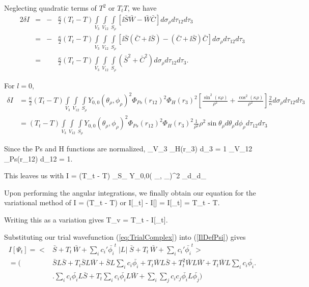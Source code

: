 \documentclass[Dissertation.tex]{subfiles}
\begin{document}
\noindent Neglecting quadratic terms of $T^2$ or $T_t T$, we have
\begin{alignat}{2}
\nonumber \delta I &={}& -&\frac{\kappa}{2} (T_t - T) \int\limits_{V_3} \int\limits_{V_{12}} \int\limits_{S_\rho} \left[\ii \bar{S}\bar{W} - \bar{W}\bar{C}\right] d\sigma_\rho d\tau_{12} d\tau_3 \\
\nonumber &={}& -&\frac{\kappa}{2} (T_t - T) \int\limits_{V_3} \int\limits_{V_{12}} \int\limits_{S_\rho} \left[\ii\bar{S}\left(\bar{C} + \ii\bar{S}\right) - \left(\bar{C} + \ii\bar{S}\right)\bar{C}\right] d\sigma_\rho d\tau_{12} d\tau_3 \\
&={}& &\frac{\kappa}{2} (T_t - T) \int\limits_{V_3} \int\limits_{V_{12}} \int\limits_{S_\rho} \left(\bar{S}^2 + \bar{C}^2\right) d\sigma_\rho d\tau_{12} d\tau_3.
\end{alignat}

For $l = 0$,
\begin{align}
\nonumber \delta I &= \frac{\kappa}{2} (T_t - T) \int\limits_{V_3} \int\limits_{V_{12}} \int\limits_{S_\rho} Y_{0,0}\left( \theta_\rho, \phi_\rho \right)^2 \Phi_{Ps}(r_{12})^2 \Phi_H(r_3)^2 \left[ \frac{\sin^2(\kappa\rho)}{\rho^2} + \frac{\cos^2(\kappa\rho)}{\rho^2}\right] \frac{2}{\kappa} d\sigma_\rho d\tau_{12} d\tau_3 \\
&= (T_t - T) \int\limits_{V_3} \int\limits_{V_{12}} \int\limits_{S_\rho} Y_{0,0}\left( \theta_\rho, \phi_\rho \right)^2 \Phi_{Ps}(r_{12})^2 \Phi_H(r_3)^2 \frac{1}{\rho^2} \rho^2 \sin\theta_\rho d\theta_\rho d\phi_\rho d\tau_{12} d\tau_3
\end{align}

Since the Ps and H functions are normalized,
\beq
\int\limits_{V_3}\! \Phi_H(r_3) d\tau_3 = 1  \int\limits_{V_{12}}\! \Phi_{Ps}(r_{12}) d\tau_{12} = 1.
\label{eq:PsHNormalization}
\eeq

This leaves us with
\beq
\delta I = (T_t - T) \int\limits_{S_\rho} Y_{0,0}\left( \theta_\rho, \phi_\rho \right)^2 \sin\theta_\rho d\theta_\rho d\phi_\rho
\eeq

Upon performing the angular integrations, we finally obtain our equation for the variational method of
\beq
\delta I = (T_t - T)
\eeq
or
\beq
I[\Psi_t] - I[\Psi] = I[\Psi_t] = T_t - T.
\eeq

\noindent Writing this as a variation gives
\beq
T_v = T_t - I[\Psi_t].
\label{eq:ComplexKohnVariation}
\eeq

Substituting our trial wavefunction (\ref{eq:TrialComplex}) into (\ref{IlDefPsi}) gives
\begin{align}
\nonumber I[\Psi_t] = \Big< &\bar{S} + T_t \, \bar{W} + \sum_{i} c_i' \bar{\phi_i}^t \;\Big| L \Big|\; \bar{S} + T_t \, \bar{W} + \sum_{i} c_i' \bar{\phi_i}^t \Big> \\
\nonumber = \Big( &\bar{S} L \bar{S} + T_t \bar{S} L \bar{W} + \bar{S} L \sum_{i} c_i \bar{\phi_i} + T_t \bar{W} L \bar{S} + T_t^2 \bar{W}L\bar{W} + T_t \bar{W} L \sum_{i} c_i \bar{\phi_i} \Big. \\
& \Big. \sum_{i} c_i \bar{\phi_i} L \bar{S} + T_t \sum_{i} c_i \bar{\phi_i} L \bar{W} + \sum_{i} \sum_{j} c_i c_j \bar{\phi_i} L \bar{\phi_j} \Big) 
\end{align}
\end{document}
